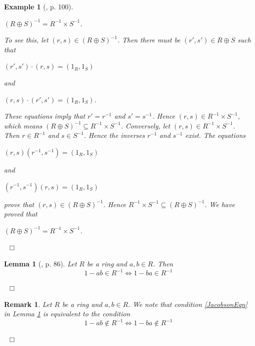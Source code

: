 \documentclass[12pt, oneside]{book}
\newtheorem{lemma}[theorem]{Lemma}
\newtheorem{example}[theorem]{Example}
\newtheorem{remark}[theorem]{Remark}
\newcommand{\proof}{{\noindent \it Proof:~}}
\newcommand{\qed}{\hfill ~$\Box$\\}
\begin{document}
\begin{example}[\cite{G1}, p. 100]
\begin{center}
$(R \oplus S)^{-1} = R^{-1} \times S^{-1}$.
\end{center}
To see this, let $(r, s) \in (R \oplus S)^{-1}$. Then there must be $(r', s') \in R \oplus S$ such that 
\begin{center}
$(r', s') \cdot (r, s) = (1_R, 1_S)$
\end{center}
and 
\begin{center}
$(r, s) \cdot (r', s') = (1_R, 1_S)$.
\end{center}
\noindent These equations imply that $r' = r^{-1}$ and $s' = s^{-1}$. 
Hence $(r, s) \in R^{-1} \times S^{-1}$, which means $(R \oplus S)^{-1} \subseteq R^{-1} \times S^{-1}$.
\vskip 0.3cm
\noindent Conversely, let $(r, s) \in R^{-1} \times S^{-1}$. Then $r \in R^{-1}$ and $s \in S^{-1}$. 
Hence the inverses $r^{-1}$ and $s^{-1}$ exist. The equations
\begin{center}
$(r, s) (r^{-1}, s^{-1}) = (1_R, 1_S)$
\end{center} 
and
\begin{center}
$(r^{-1}, s^{-1}) (r, s)  = (1_R, 1_S)$
\end{center}
prove that $(r, s) \in (R \oplus S)^{-1}$. Hence $R^{-1} \times S^{-1} \subseteq (R \oplus S)^{-1}$. 
We have proved that 
\begin{center}
$(R \oplus S)^{-1} = R^{-1} \times S^{-1}$.
\end{center}
\qed
\end{example}
\vspace{-1cm}
\begin{lemma}[\cite{CH1}, p. 86] \label{Jacobson}
\normalfont
Let $R$ be a ring and $a,b \in R$. Then 
\begin{equation} \label{JacobsonEqn}
1-ab \in R^{-1} \iff 1-ba \in R^{-1}
\end{equation}
\end{lemma}
\qed

\begin{remark}\label{JacobsonRemV2}
\normalfont
\noindent Let $R$ be a ring and $a, b \in R$. We note that condition \eqref{JacobsonEqn} in Lemma \ref{Jacobson} is equivalent to the condition
\begin{equation} \label{JacobsonEqnV2}
1-ab \notin R^{-1} \iff 1-ba \notin R^{-1}
\end{equation}
\end{remark}
\qed

\end{document}
